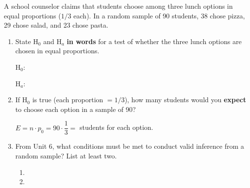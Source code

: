 \documentclass[10pt]{article}
\begin{document}
\namedateperiod

\vspace{0.15in}

A school counselor claims that students choose among three lunch options in equal
proportions ($1/3$ each). In a random sample of 90 students, 38 chose pizza, 29 chose
salad, and 23 chose pasta.

\begin{enumerate}

  \item State H$_0$ and H$_a$ \textbf{in words} for a test of whether the three lunch
        options are chosen in equal proportions.

        H$_0$: \blank{9cm}

        \vspace{0.1in}

        H$_a$: \blank{9cm}

        \vspace{0.05in}

  \item If H$_0$ is true (each proportion $= 1/3$), how many students would you
        \textbf{expect} to choose each option in a sample of 90?

        \vspace{0.05in}
        $E = n \cdot p_0 = 90 \cdot \dfrac{1}{3} = $ \blank{3cm} students for each option.

        \vspace{0.1in}

  \item From Unit 6, what conditions must be met to conduct valid inference from a
        random sample? List at least two.

        \begin{enumerate}[label=\alph*.]
          \item \blank{9cm}
          \item \blank{9cm}
        \end{enumerate}

\end{enumerate}
\end{document}
